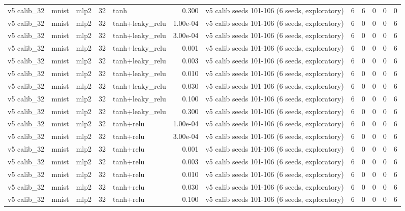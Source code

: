 \begin{table}[htbp]
{\begin{tabular}{@{}lllrlrlrrrrr@{}}
v5 calib\_32 & mnist & mlp2 & 32 & tanh & 0.300 & v5 calib seeds 101-106 (6 seeds, exploratory) & 6 & 6 & 0 & 0 & 0 \\
v5 calib\_32 & mnist & mlp2 & 32 & tanh+leaky\_relu & 1.00e-04 & v5 calib seeds 101-106 (6 seeds, exploratory) & 6 & 0 & 0 & 0 & 6 \\
v5 calib\_32 & mnist & mlp2 & 32 & tanh+leaky\_relu & 3.00e-04 & v5 calib seeds 101-106 (6 seeds, exploratory) & 6 & 0 & 0 & 0 & 6 \\
v5 calib\_32 & mnist & mlp2 & 32 & tanh+leaky\_relu & 0.001 & v5 calib seeds 101-106 (6 seeds, exploratory) & 6 & 0 & 0 & 0 & 6 \\
v5 calib\_32 & mnist & mlp2 & 32 & tanh+leaky\_relu & 0.003 & v5 calib seeds 101-106 (6 seeds, exploratory) & 6 & 0 & 0 & 0 & 6 \\
v5 calib\_32 & mnist & mlp2 & 32 & tanh+leaky\_relu & 0.010 & v5 calib seeds 101-106 (6 seeds, exploratory) & 6 & 0 & 0 & 0 & 6 \\
v5 calib\_32 & mnist & mlp2 & 32 & tanh+leaky\_relu & 0.030 & v5 calib seeds 101-106 (6 seeds, exploratory) & 6 & 0 & 0 & 0 & 6 \\
v5 calib\_32 & mnist & mlp2 & 32 & tanh+leaky\_relu & 0.100 & v5 calib seeds 101-106 (6 seeds, exploratory) & 6 & 0 & 0 & 0 & 6 \\
v5 calib\_32 & mnist & mlp2 & 32 & tanh+leaky\_relu & 0.300 & v5 calib seeds 101-106 (6 seeds, exploratory) & 6 & 0 & 0 & 0 & 6 \\
v5 calib\_32 & mnist & mlp2 & 32 & tanh+relu & 1.00e-04 & v5 calib seeds 101-106 (6 seeds, exploratory) & 6 & 0 & 0 & 0 & 6 \\
v5 calib\_32 & mnist & mlp2 & 32 & tanh+relu & 3.00e-04 & v5 calib seeds 101-106 (6 seeds, exploratory) & 6 & 0 & 0 & 0 & 6 \\
v5 calib\_32 & mnist & mlp2 & 32 & tanh+relu & 0.001 & v5 calib seeds 101-106 (6 seeds, exploratory) & 6 & 0 & 0 & 0 & 6 \\
v5 calib\_32 & mnist & mlp2 & 32 & tanh+relu & 0.003 & v5 calib seeds 101-106 (6 seeds, exploratory) & 6 & 0 & 0 & 0 & 6 \\
v5 calib\_32 & mnist & mlp2 & 32 & tanh+relu & 0.010 & v5 calib seeds 101-106 (6 seeds, exploratory) & 6 & 0 & 0 & 0 & 6 \\
v5 calib\_32 & mnist & mlp2 & 32 & tanh+relu & 0.030 & v5 calib seeds 101-106 (6 seeds, exploratory) & 6 & 0 & 0 & 0 & 6 \\
v5 calib\_32 & mnist & mlp2 & 32 & tanh+relu & 0.100 & v5 calib seeds 101-106 (6 seeds, exploratory) & 6 & 0 & 0 & 0 & 6 \\

\end{tabular}}
\end{table}
